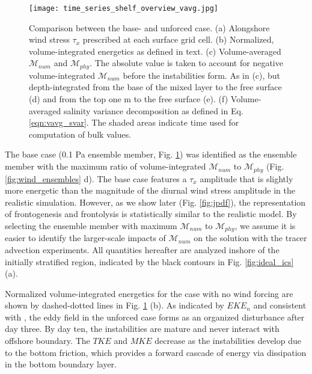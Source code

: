 \documentclass[draft]{agujournal2019}
\begin{document}
\begin{figure}[t!]
    \begin{center}
    \texttt{[image: time\_series\_shelf\_overview\_vavg.jpg]}\\
    \caption{Comparison between the base- and unforced case. (a) Alongshore wind stress $\tau_x$ prescribed at each surface grid cell. (b) Normalized, volume-integrated energetics as defined in text. (c) Volume-averaged $\mathcal{M}_{num}$ and $\mathcal{M}_{phy}$. The absolute value is taken to account for negative volume-integrated $\mathcal{M}_{num}$ before the instabilities form. As in (c), but depth-integrated from the base of the mixed layer to the free surface (d) and from the top one m to the free surface (e). (f) Volume-averaged salinity variance decomposition as defined in Eq. \ref{eqn:vavg_svar}. The shaded areas indicate time used for computation of bulk values.}\label{fig:time_series_base}
     \end{center}
\end{figure} 

The base case (0.1 Pa ensemble member, Fig. \ref{fig:time_series_base}) was identified as the ensemble member with the maximum ratio of volume-integrated $\mathcal{M}_{num}$ to $\mathcal{M}_{phy}$ (Fig. \ref{fig:wind_ensembles} d). The base case features a $\tau_x$ amplitude that is slightly more energetic than the magnitude of the diurnal wind stress amplitude in the realistic simulation. However, as we show later (Fig. \ref{fig:jpdf}), the representation of frontogenesis and frontolysis is statistically similar to the realistic model. By selecting the ensemble member with maximum $\mathcal{M}_{num}$ to $\mathcal{M}_{phy}$, we assume it is easier to identify the larger-scale impacts of $\mathcal{M}_{num}$ on the solution with the tracer advection experiments. All quantities hereafter are analyzed inshore of the initially stratified region, indicated by the black contours in Fig. \ref{fig:ideal_ics} (a). 

Normalized volume-integrated energetics for the case with no wind forcing are shown by dashed-dotted lines in Fig. \ref{fig:time_series_base} (b). As indicated by $EKE_n$ and consistent with , the eddy field in the unforced case forms as an organized disturbance after day three. By day ten, the instabilities are mature and never interact with offshore boundary. The $TKE$ and $MKE$ decrease as the instabilities develop due to the bottom friction, which provides a forward cascade of energy via dissipation in the bottom boundary layer. 
\end{document}
